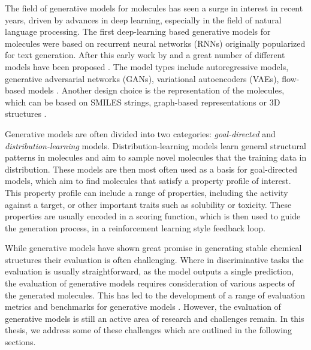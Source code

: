 The field of generative models for molecules has seen a surge in interest in
recent years, driven by advances in deep learning, especially in the field of
natural language processing. The first deep-learning based generative models for
molecules were based on recurrent neural networks (RNNs) originally popularized
for text generation. After this early work by
\citep{seglerGeneratingFocusedMolecule2018} and
\citep{gomez-bombarelliAutomaticChemicalDesign2018} a great number of different
models have been proposed
\citep{eltonDeepLearningMolecular2019,sanchez-lengelingInverseMolecularDesign2018}.
The model types include autoregressive models, generative adversarial networks
(GANs), variational autoencoders (VAEs), flow-based models
\citep{madhawaGraphNVPInvertibleFlow2019}. Another design choice is the
representation of the molecules, which can be based on SMILES strings,
graph-based representations or 3D structures
\citep{eltonDeepLearningMolecular2019,sanchez-lengelingInverseMolecularDesign2018}.

Generative models are often divided into two categories: \emph{goal-directed}
and \emph{distribution-learning} models. Distribution-learning models learn
general structural patterns in molecules and aim to sample novel molecules that
the training data in distribution. These models are then most often used as a
basis for goal-directed models, which aim to find molecules that satisfy a
property profile of interest. This property profile can include a range of
properties, including the activity against a target, or other important traits
such as solubility or toxicity. These properties are usually encoded in a
scoring function, which is then used to guide the generation process, in a
reinforcement learning style feedback loop.

While generative models have shown great promise in generating stable chemical
structures their evaluation is often challenging. Where in discriminative tasks
the evaluation is usually straightforward, as the model outputs a single
prediction, the evaluation of generative models requires consideration of
various aspects of the generated molecules. This has led to the development of a
range of evaluation metrics \citep{preuerFrechetChemNetDistance2018,gaoSynthesizabilityMoleculesProposed2020} and
benchmarks for generative models
\citep{polykovskiyMolecularSetsMOSES2020,brownGuacaMolBenchmarkingModels2019}.
However, the evaluation of generative models is still an active area of research
and challenges remain. In this thesis, we address some of these challenges 
which are outlined in the following sections.

